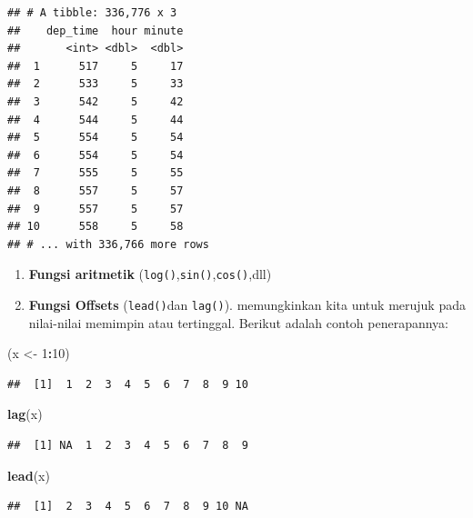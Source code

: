 \documentclass[]{book}
\newenvironment{Shaded}{\begin{snugshade}}{\end{snugshade}}
\newcommand{\KeywordTok}[1]{\textcolor[rgb]{0.13,0.29,0.53}{\textbf{#1}}}
\newcommand{\DecValTok}[1]{\textcolor[rgb]{0.00,0.00,0.81}{#1}}
\newcommand{\StringTok}[1]{\textcolor[rgb]{0.31,0.60,0.02}{#1}}
\newcommand{\OperatorTok}[1]{\textcolor[rgb]{0.81,0.36,0.00}{\textbf{#1}}}
\newcommand{\NormalTok}[1]{#1}
\providecommand{\tightlist}{%
  \setlength{\itemsep}{0pt}\setlength{\parskip}{0pt}}
\begin{document}
\begin{verbatim}
## # A tibble: 336,776 x 3
##    dep_time  hour minute
##       <int> <dbl>  <dbl>
##  1      517     5     17
##  2      533     5     33
##  3      542     5     42
##  4      544     5     44
##  5      554     5     54
##  6      554     5     54
##  7      555     5     55
##  8      557     5     57
##  9      557     5     57
## 10      558     5     58
## # ... with 336,766 more rows
\end{verbatim}

\begin{enumerate}
\def\labelenumi{\arabic{enumi}.}
\setcounter{enumi}{1}
\tightlist
\item
  \textbf{Fungsi aritmetik}
  (\texttt{log()},\texttt{sin()},\texttt{cos()},dll)
\item
  \textbf{Fungsi Offsets} (\texttt{lead()}dan \texttt{lag()}).
  memungkinkan kita untuk merujuk pada nilai-nilai memimpin atau
  tertinggal. Berikut adalah contoh penerapannya:
\end{enumerate}

\begin{Shaded}
\begin{Highlighting}[]
\NormalTok{(x <-}\StringTok{ }\DecValTok{1}\OperatorTok{:}\DecValTok{10}\NormalTok{)}
\end{Highlighting}
\end{Shaded}

\begin{verbatim}
##  [1]  1  2  3  4  5  6  7  8  9 10
\end{verbatim}

\begin{Shaded}
\begin{Highlighting}[]
\KeywordTok{lag}\NormalTok{(x)}
\end{Highlighting}
\end{Shaded}

\begin{verbatim}
##  [1] NA  1  2  3  4  5  6  7  8  9
\end{verbatim}

\begin{Shaded}
\begin{Highlighting}[]
\KeywordTok{lead}\NormalTok{(x)}
\end{Highlighting}
\end{Shaded}

\begin{verbatim}
##  [1]  2  3  4  5  6  7  8  9 10 NA
\end{verbatim}
\end{document}
